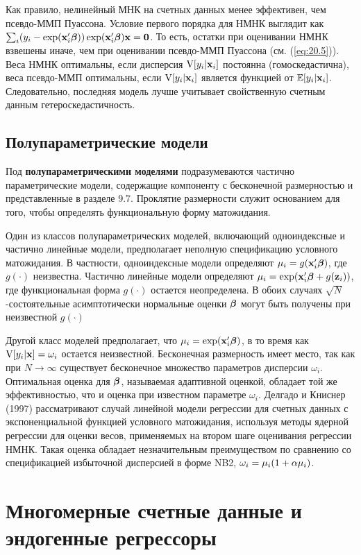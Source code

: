 Как правило, нелинейный МНК на счетных данных менее эффективен, чем псевдо-ММП Пуассона. Условие первого порядка для НМНК выглядит как $\sum_i (y_i - \exp(\mathbf{x}_i'\bm{\beta}))\exp(\mathbf{x}_i'\bm{\beta})\mathbf{x} = \mathbf{0}$. То есть, остатки при оценивании НМНК взвешены иначе, чем при оценивании псевдо-ММП Пуассона (см. (\ref{eq:20.5})). Веса НМНК оптимальны, если дисперсия $\mathrm{V}[y_i|\mathbf{x}_i]$ постоянна (гомоскедастична), веса псевдо-ММП оптимальны, если $\mathrm{V}[y_i|\mathbf{x}_i]$ является функцией от $\mathbb{E}[y_i|\mathbf{x}_i]$. Следовательно, последняя модель лучше учитывает свойственную счетным данным гетероскедастичность.


\subsection{Полупараметрические модели}\label{sec:20.5.3}

\noindent
Под \textbf{полупараметрическими моделями} подразумеваются частично параметрические модели, содержащие компоненту с бесконечной размерностью и представленные в разделе 9.7. Проклятие размерности служит основанием для того, чтобы определять функциональную форму матожидания.

Один из классов полупараметрических моделей, включающий одноиндексные и частично линейные модели, предполагает неполную спецификацию условного матожидания. В частности, одноиндексные модели определяют $\mu_i = g(\mathbf{x}_i'\bm{\beta})$, где $g(\cdot)$ неизвестна. Частично линейные модели определяют $\mu_i = \exp(\mathbf{x}_i'\bm{\beta} + g(\mathbf{z}_i))$, где функциональная форма $g(\cdot)$ остается неопределена. В обоих случаях $\sqrt{N}$-состоятельные асимптотически нормальные оценки $\bm{\beta}$ могут быть получены при неизвестной $g(\cdot)$

Другой класс моделей предполагает, что $\mu_i = \exp(\mathbf{x}_i'\bm{\beta})$, в то время как $\mathrm{V}[y_i|\mathbf{x}] = \omega_i$ остается неизвестной. Бесконечная размерность имеет место, так как при $N \rightarrow \infty$ существует бесконечное множество параметров дисперсии $\omega_i$. Оптимальная оценка для $\bm{\beta}$, называемая адаптивной оценкой, обладает той же эффективностью, что и оценка при известном параметре $\omega_i$. Делгадо и Книснер (1997) рассматривают случай линейной модели регрессии для счетных данных с экспоненциальной функцией условного матожидания, используя методы ядерной регрессии для оценки весов, применяемых на втором шаге оценивания регрессии НМНК. Такая оценка обладает незначительным преимуществом по сравнению со спецификацией избыточной дисперсией в форме NB2, $\omega_i = \mu_i (1 + \alpha\mu_i)$.


\section{Многомерные счетные данные и эндогенные регрессоры}\label{sec:20.6}

